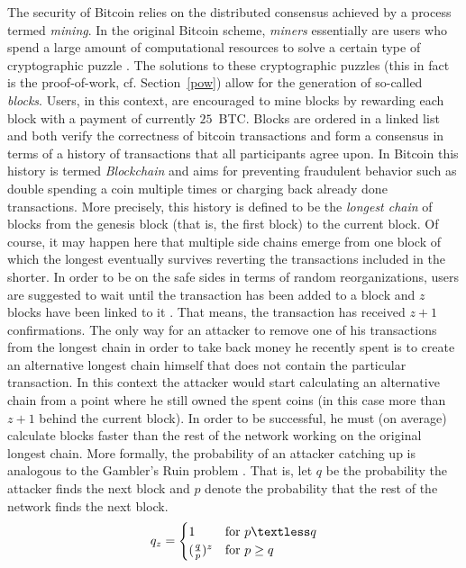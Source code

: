 \documentclass{sig-alternate}
\begin{document}
The security of Bitcoin relies on the distributed consensus achieved by a process termed \emph{mining}.
In the original Bitcoin scheme, \emph{miners} essentially are users who spend a large amount of computational resources to solve a certain type of cryptographic puzzle \cite{nakamoto2008bitcoin}.
The solutions to these cryptographic puzzles (this in fact is the proof-of-work, cf. Section~\ref{pow}) allow for the generation of so-called \emph{blocks}. Users, in this context, are encouraged to mine blocks by rewarding each block with a payment of currently $25$~BTC.
Blocks are ordered in a linked list and both verify the correctness of bitcoin transactions and form a consensus in terms of a history of transactions that all participants agree upon.
In Bitcoin this history is termed \emph{Blockchain} and aims for preventing fraudulent behavior such as double spending a coin multiple times \cite{karame2012double} or charging back already done transactions.
More precisely, this history is defined to be the \emph{longest chain} of blocks from the genesis block (that is, the first block) to the current block.
Of course, it may happen here that multiple side chains emerge from one block of which the longest  eventually survives reverting the transactions included in the shorter.
In order to be on the safe sides in terms of random reorganizations, users are suggested to wait until the transaction has been added to a block and $z$ blocks have been linked to it \cite{nakamoto2008bitcoin}. That means, the transaction has received $z + 1$ confirmations.
The only way for an attacker to remove one of his transactions from the longest chain in order to take back money he recently spent is to create an alternative longest chain himself that does not contain the particular transaction.
In this context the attacker would start calculating an alternative chain from a point where he still owned the spent coins (in this case more than $z + 1$ behind the current block).
In order to be successful, he must (on average) calculate blocks faster than the rest of the network working on the original longest chain.
More formally, the probability of an attacker catching up is analogous to the Gambler's Ruin problem \cite{feller2008introduction,nakamoto2008bitcoin}.
That is, let $q$ be the probability the attacker finds the next block and $p$ denote the probability that the rest of the network finds the next block.
\begin{equation*}
   q_z =
   \begin{cases}
     1 & \text{for } p \textless q \\
     (\frac{q}{p})^z & \text{for } p \geq q \\
   \end{cases}
\end{equation*}
\end{document}
